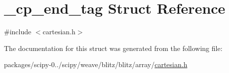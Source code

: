 \hypertarget{struct__cp__end__tag}{}\section{\+\_\+cp\+\_\+end\+\_\+tag Struct Reference}
\label{struct__cp__end__tag}


{\ttfamily \#include $<$cartesian.\+h$>$}



The documentation for this struct was generated from the following file\+:\begin{DoxyCompactItemize}
\item 
packages/scipy-\/0../scipy/weave/blitz/blitz/array/\hyperlink{cartesian_8h}{cartesian.\+h}\end{DoxyCompactItemize}
